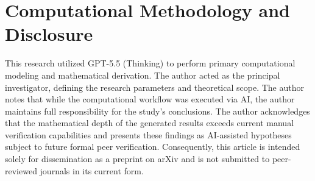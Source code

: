 \documentclass[a4paper,11pt]{article}
\numberwithin{equation}{section}
\begin{document}
\section*{Computational Methodology and Disclosure}

This research utilized GPT-5.5 (Thinking) to perform primary computational modeling and mathematical derivation. The author acted as the principal investigator, defining the research parameters and theoretical scope. The author notes that while the computational workflow was executed via AI, the author maintains full responsibility for the study's conclusions. The author acknowledges that the mathematical depth of the generated results exceeds current manual verification capabilities and presents these findings as AI-assisted hypotheses subject to future formal peer verification. Consequently, this article is intended solely for dissemination as a preprint on arXiv and is not submitted to peer-reviewed journals in its current form.



\end{document}
